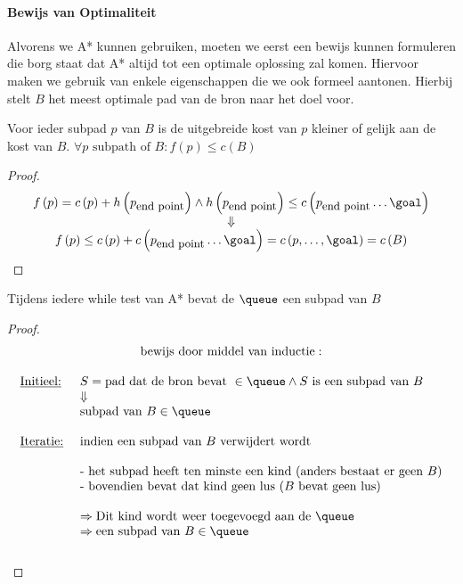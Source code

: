 \paragraph{Bewijs van Optimaliteit}
Alvorens we A* kunnen gebruiken, moeten we eerst een bewijs kunnen formuleren die borg staat dat A* altijd tot een optimale oplossing zal komen. Hiervoor maken we gebruik van enkele eigenschappen die we ook formeel aantonen. Hierbij stelt $B$ het meest optimale pad van de bron naar het doel voor.
\begin{theorem}
Voor ieder subpad $p$ van $B$ is de uitgebreide kost van $p$ kleiner of gelijk aan de kost van $B$. $\forall p \mbox{ subpath of } B: f\left(p\right)\leq c\left(B\right)$
\end{theorem}
\begin{proof}
\[
\begin{array}{c}
f\left(p\right)=c\left(p\right)+h\left(p_{\mbox{\small{end point}}}\right)\wedge h\left(p_{\mbox{\small{end point}}}\right)\leq c\left(p_{\mbox{\small{end point}}}\ldots\goal\right)\\
\Downarrow\\
f\left(p\right)\leq c\left(p\right)+c\left(p_{\mbox{\small{end point}}}\ldots\goal\right)=c\left(p,\ldots,\goal\right)=c\left(B\right)
\end{array}
\]
\end{proof}
\begin{theorem}
Tijdens iedere while test van A* bevat de $\queue$ een subpad van $B$
\label{the:astarsubpath}
\end{theorem}
\begin{proof}
\[
\begin{array}{c}
\mbox{bewijs door middel van inductie}:\\\\
\begin{array}{ll}
\mbox{\underline{Initieel:} }&S=\mbox{pad dat de bron bevat } \in\queue\wedge S \mbox{ is een subpad van } B\\
&\Downarrow\\
&\mbox{subpad van }B\in\queue\\\\
\mbox{\underline{Iteratie:} }&\mbox{indien een subpad van $B$ verwijdert wordt}\\\\
&\mbox{- het subpad heeft ten minste een kind (anders bestaat er geen $B$)}\\
&\mbox{- bovendien bevat dat kind geen lus ($B$ bevat geen lus)}\\\\
&\Rightarrow\mbox{Dit kind wordt weer toegevoegd aan de $\queue$}\\
&\Rightarrow\mbox{een subpad van }B\in\queue\\\\
\end{array}
\end{array}
\]
\end{proof}
